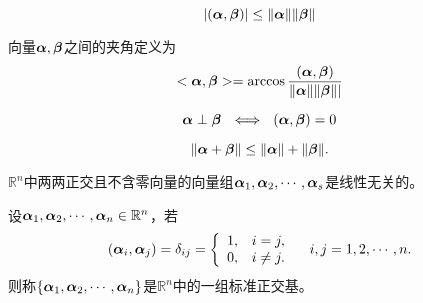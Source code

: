 \begin{frame}
  
  \begin{dingli}
    $$
    |(\boldsymbol{\alpha},\boldsymbol{\beta})|\le\|\boldsymbol{\alpha}\|\|\boldsymbol{\beta}\|
    $$
  \end{dingli}  

  \begin{dingyi}[向量之间的夹角]
    向量$\boldsymbol{\alpha},\boldsymbol{\beta}$之间的夹角定义为
    $$
    <\boldsymbol{\alpha},\boldsymbol{\beta}>=\arccos\frac{(\boldsymbol{\alpha},\boldsymbol{\beta})}{\|\boldsymbol{\alpha}\|\|\boldsymbol{\beta}\||}
    $$
  \end{dingyi}  
  
  \begin{dingli}
    $$\boldsymbol{\alpha}\perp\boldsymbol{\beta} ~~\Longleftrightarrow~~
    (\boldsymbol{\alpha},\boldsymbol{\beta})=0
    $$
  \end{dingli}  


  \begin{dingli}[三角不等式]
    $$
    \|\boldsymbol{\alpha}+\boldsymbol{\beta}\|\le\|\boldsymbol{\alpha}\|+\|\boldsymbol{\beta}\|.
    $$
  \end{dingli}
  
  
\end{frame}



\begin{frame}
  
  \begin{dingli}
    $\mathbb R^n$中两两正交且不含零向量的向量组$\boldsymbol{\alpha}_1,\boldsymbol{\alpha}_2,\cdots,\boldsymbol{\alpha}_s$是线性无关的。
  \end{dingli}  \vspace{.15in}
  
  \begin{dingyi}[标准正交基]
    设$\boldsymbol{\alpha}_1,\boldsymbol{\alpha}_2,\cdots,\boldsymbol{\alpha}_n\in \mathbb R^n$，若
    $$
    (\boldsymbol{\alpha}_i,\boldsymbol{\alpha}_j)=\delta_{ij}=\left\{
      \begin{array}{ll}
        1,& i=j,\\
        0,& i\ne j.
      \end{array}
    \right. \quad i,j=1,2,\cdots,n.
    $$
    则称$\{\boldsymbol{\alpha}_1,\boldsymbol{\alpha}_2,\cdots,\boldsymbol{\alpha}_n\}$是$\mathbb R^n$中的一组标准正交基。
  \end{dingyi}
  
\end{frame}



